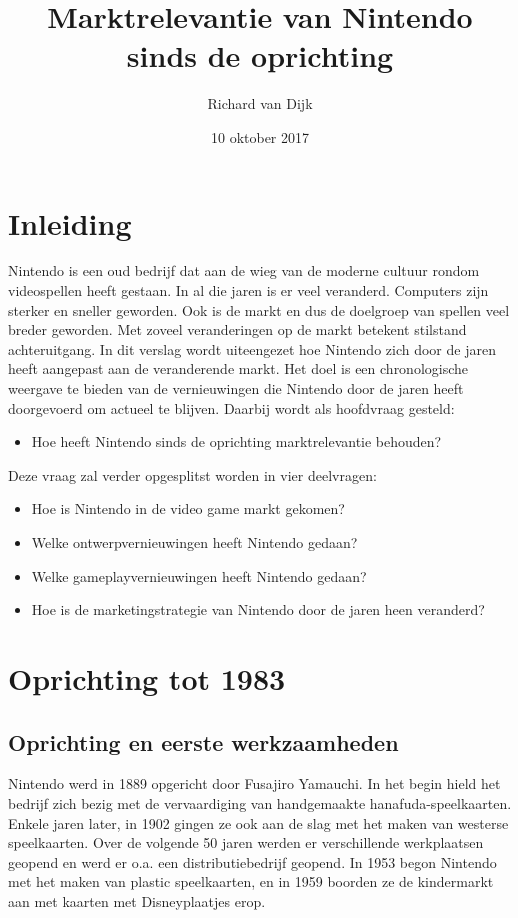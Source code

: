 \documentclass{article}
\title{Marktrelevantie van Nintendo sinds de oprichting}
\date{10 oktober 2017}
\author{Richard van Dijk}
\begin{document}
\maketitle
\newpage
\tableofcontents
\newpage





\section{Inleiding}

Nintendo is een oud bedrijf dat aan de wieg van de moderne cultuur rondom videospellen heeft gestaan. In al die jaren is er veel veranderd. Computers zijn sterker en sneller geworden. Ook is de markt en dus de doelgroep van spellen veel breder geworden. Met zoveel veranderingen op de markt betekent stilstand achteruitgang. In dit verslag wordt uiteengezet hoe Nintendo zich door de jaren heeft aangepast aan de veranderende markt. Het doel is een chronologische weergave te bieden van de vernieuwingen die Nintendo door de jaren heeft doorgevoerd om actueel te blijven. Daarbij wordt als hoofdvraag gesteld:
\begin{itemize} \item Hoe heeft Nintendo sinds de oprichting marktrelevantie behouden? \end{itemize}
Deze vraag zal verder opgesplitst worden in vier deelvragen:
\begin{itemize}
\item Hoe is Nintendo in de video game markt gekomen?
\item Welke ontwerpvernieuwingen heeft Nintendo gedaan?
\item Welke gameplayvernieuwingen heeft Nintendo gedaan?
\item Hoe is de marketingstrategie van Nintendo door de jaren heen veranderd?
\end{itemize}

\section{Oprichting tot 1983}
\subsection{Oprichting en eerste werkzaamheden}
Nintendo werd in 1889 opgericht door Fusajiro Yamauchi. In het begin hield het bedrijf zich bezig met de vervaardiging van handgemaakte hanafuda-speelkaarten. Enkele jaren later, in 1902 gingen ze ook aan de slag met het maken van westerse speelkaarten. Over de volgende 50 jaren werden er verschillende werkplaatsen geopend en werd er o.a. een distributiebedrijf geopend. In 1953 begon Nintendo met het maken van plastic speelkaarten, en in 1959 boorden ze de kindermarkt aan met kaarten met Disneyplaatjes erop. 
\end{document}
